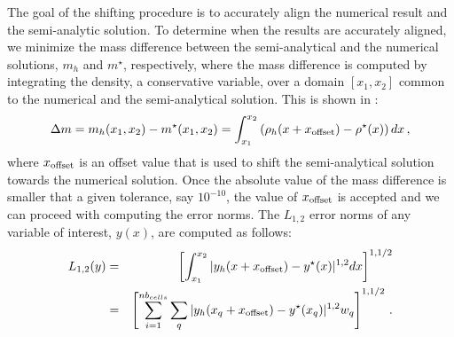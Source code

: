 \documentclass[times,doublespace]{fldauth}%
\begin{document}
The goal of the shifting procedure is to accurately align the numerical result and the semi-analytic solution.
To determine when the results are accurately aligned, we minimize the mass difference between the semi-analytical and the numerical solutions, $m_h$ and $m^\star$, respectively, where the mass difference is computed by integrating the density, a conservative variable, over a domain $[x_1, x_2]$ common to the numerical and the semi-analytical solution.
This is shown in :
%
\begin{equation}\label{eq:mass-diff}
\Delta m = m_h(x_1,x_2) - m^\star(x_1,x_2) = \int_{x_1}^{x_2} \left( \rho_h (x+x_{\text{\text{offset}}}) - \rho^\star (x)\right) dx \, ,
\end{equation}
%
where $x_{\text{\text{offset}}}$ is an offset value that is used to shift the semi-analytical solution towards the numerical solution. Once the absolute value of the mass difference is smaller that a given tolerance, say $10^{-10}$, the value of $x_{\text{\text{offset}}}$ is accepted and we can proceed with computing the error norms. The $L_{1,2}$ error norms of any variable of interest, $y(x)$, are computed as follows:
%
\begin{eqnarray}\label{eq:l1-error-norm}
L_{1,2}(y) &=& \left[ \int_{x_1}^{x_2} | y_h(x+x_{\text{\text{offset}}}) - y^\star(x) |^{1,2} dx \right]^{1,1/2} \\ 
&=& \left[ \sum_{i=1}^{nb_{cells}} \sum_{q} | y_h(x_q+x_{\text{\text{offset}}}) - y^\star(x_q) |^{1,2} w_q \right]^{1,1/2} \, .
\end{eqnarray}
%
\end{document}
